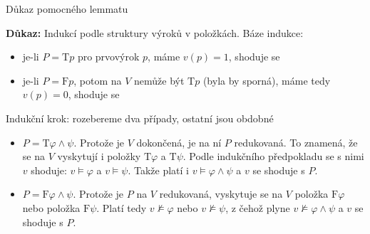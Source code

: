 \documentclass{beamer}
\begin{document}
\begin{frame}{Důkaz pomocného lemmatu}

    \textbf{Důkaz:}
    Indukcí podle struktury výroků v položkách. \pause \alert{Báze indukce:} \pause
    \begin{itemize}
        \item je-li \alert{$P=\mathrm{T}p$} pro prvovýrok $p$, máme $v(p)=1$, shoduje se\pause
        \item je-li \alert{$P=\mathrm{F}p$}, potom na $V$ nemůže být $\mathrm{T}p$ (byla by sporná), máme tedy $v(p)=0$, shoduje se\pause
    \end{itemize}

    \alert{Indukční krok:} \pause rozebereme dva případy, ostatní jsou obdobné \pause

    \begin{itemize}
        \item \alert{$P=\mathrm{T}\varphi\land\psi$}. Protože je $V$ dokončená, je na ní $P$ redukovaná. To znamená, že se na $V$ vyskytují i položky $\mathrm{T}\varphi$ a $\mathrm{T}\psi$. Podle indukčního předpokladu se s nimi $v$ shoduje: $v\models\varphi$ a $v\models\psi$. Takže platí i $v\models\varphi\land\psi$ a $v$ se shoduje s $P$.\pause
    
        \item \alert{$P=\mathrm{F}\varphi\land\psi$}. Protože je $P$ na $V$ redukovaná, vyskytuje se na $V$ položka $\mathrm{F}\varphi$ nebo položka $\mathrm{F}\psi$. Platí tedy $v\not\models\varphi$ nebo $v\not\models\psi$, z čehož plyne $v\not\models\varphi\land\psi$ a $v$ se shoduje s $P$.\hfill\qedsymbol
    \end{itemize}

\end{frame}
\end{document}
